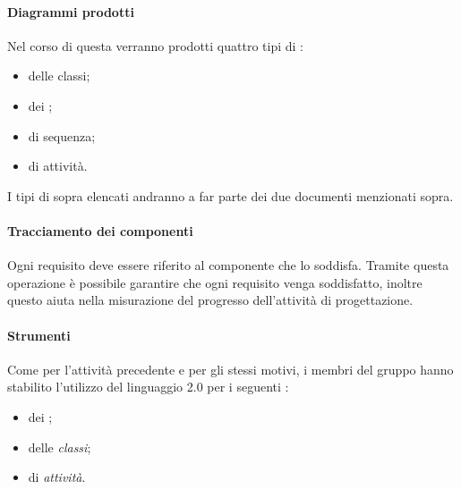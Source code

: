                         \paragraph*{Diagrammi prodotti}
                        Nel corso di questa  verranno prodotti quattro tipi di  :
                        \begin{itemize}
                        \item {} delle classi;
                        \item {} dei ;
                        \item {} di sequenza;
                        \item {} di attivit\`a.
                        \end{itemize}
                        I tipi di  sopra elencati andranno a far parte dei due documenti menzionati sopra.
		
			\paragraph*{Tracciamento dei componenti}
			Ogni requisito deve essere riferito al componente che lo soddisfa. Tramite questa operazione è possibile garantire che ogni requisito venga
			soddisfatto, inoltre questo aiuta nella misurazione del progresso dell'attività di progettazione.		
			
		        \paragraph*{Strumenti}
		        Come per l'attivit\`a precedente e per gli stessi motivi, i membri del gruppo hanno stabilito l'utilizzo del linguaggio  2.0 per i seguenti
		        :
		        \begin{itemize}
			\item {} dei ; 
			\item {} delle \textit{classi};	
			\item {} di \textit{attivit\`a}.
		        \end{itemize}
			 
